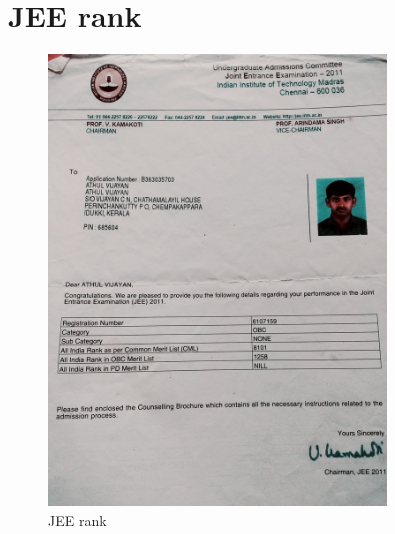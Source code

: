 \documentclass[11pt]{article}
\begin{document}
{\section{JEE rank}
\begin{figure}[h]
\centering
\includegraphics[width=0.8\textwidth]{jee.jpg}
\caption{JEE rank}
\label{gauss}
\end{figure}
\FloatBarrier

}
\end{document}
